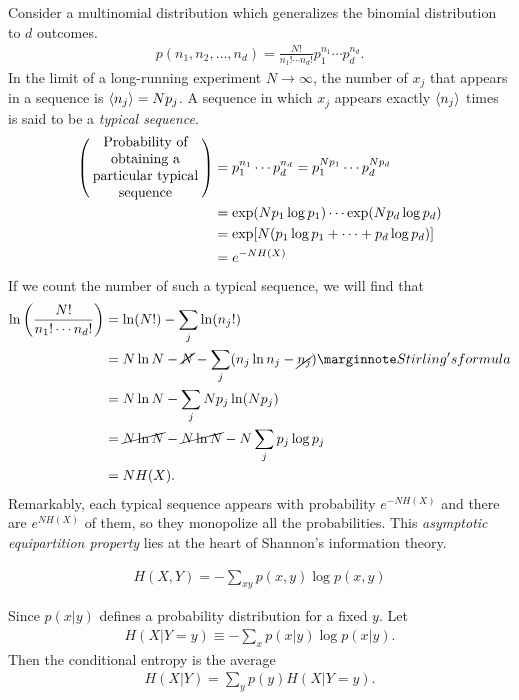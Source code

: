 \begin{example}\leavevmode
	
	Consider a multinomial distribution which generalizes the binomial distribution to $d$ outcomes.
	\begin{align}
		p(n_1,n_2,\dots,n_d) = \frac{N!}{n_1!\cdots n_d!} p_1^{n_1} \cdots p_d^{n_d}.	
	\end{align}
	In the limit of a long-running experiment $N\to\infty$, the number of $x_j$ that appears in a sequence is $\left\langle n_j \right\rangle = Np_j$. A sequence in which $x_j$ appears exactly $\left\langle n_j \right\rangle$ times is said to be a \emph{typical sequence}.
	\begin{align}
		\left(\parbox{8em}{\centering Probability of obtaining a particular typical sequence}\right) &= p_1^{n_1} \cdots p_d^{n_d} 
		= p_1^{Np_1} \cdots p_d^{Np_d} \\
		&= \exp(Np_1\log p_1) \cdots \exp(Np_d\log p_d) \\
		&= \exp[N(p_1 \log p_1 + \cdots + p_d \log p_d)] \\
		&= e^{-NH(X)}
	\end{align}
	If we count the number of such a typical sequence, we will find that
	\begin{align}
		\ln\left(\frac{N!}{n_1!\cdots n_d!}\right)
		&= \ln (N!) - \sum_j \ln (n_j!) \\
		&= N\ln N - \cancel{N} - \sum_j (n_j \ln n_j - \cancel{n_j}) \mnf{Stirling's formula} \\
		&= N\ln N - \sum_j Np_j \ln (Np_j) \\
		&= \cancel{N\ln N} - \cancel{N\ln N} - N\sum_j p_j \log p_j \\
		&= NH(X).
	\end{align}
	Remarkably, each typical sequence appears with probability $e^{-NH(X)}$ and there are $e^{NH(X)}$ of them, so they monopolize all the probabilities. This \emph{asymptotic equipartition property} lies at the heart of Shannon's information theory.
\end{example}

\begin{definition}\leavevmode
	\begin{align}
		H(X,Y) = -\sum_{xy} p(x,y) \log p(x,y)
	\end{align}
\end{definition}

\begin{definition}\leavevmode
	Since $p(x|y)$ defines a probability distribution for a fixed $y$. Let
	\begin{align}
		H(X|Y=y) \equiv -\sum_x p(x|y)\log p(x|y).
	\end{align}
	Then the conditional entropy is the average
	\begin{align}
		H(X|Y) = \sum_y p(y)H(X|Y=y).
	\end{align}
\end{definition}


